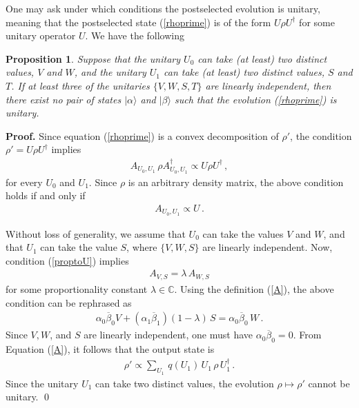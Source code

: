 \documentclass[aps,prl,twocolumn,superscriptaddress,groupedaddress]{revtex4}
\newtheorem{proposition}[theorem]{Proposition}
\def\>{\rangle}
\begin{document}
One may ask under which conditions the postselected evolution is unitary, meaning that the  postselected state  (\ref{rhoprime}) is of the form $U  \rho U^\dag$ for some unitary operator $U$.   
We have the following 
\begin{proposition}\label{prop:nonoiseless}
Suppose that the unitary $U_0 $ can take (at least) two distinct values, $V$ and $W$, and the unitary $U_1$ can take (at least) two distinct values, $S$ and $T$.  If at least three of the unitaries $\{ V, W, S, T\}$ are linearly independent, then there exist no pair of states $|\alpha\>$ and $|\beta\>$ such that the evolution (\ref{rhoprime}) is unitary. 
\end{proposition}  

{\bf Proof. }     Since equation (\ref{rhoprime}) is a convex decomposition of  $\rho'$,  the condition $\rho'  =  U\rho  U^\dag $ implies 
\begin{align}
 A_{U_0, U_1}\,  \rho  A_{U_0, U_1}^\dag    \propto  U \rho U^\dag \, ,
\end{align}  
for every $U_0$ and $U_1$.   Since $\rho$ is an arbitrary density matrix, the above condition holds if and only if 
\begin{align}\label{proptoU}  A_{U_0, U_1}\propto U\, .
\end{align} 

Without loss of generality, we assume that   $U_0$ can take the values $V$ and $W$, and that $U_1$ can take the value $S$, where  $\{V,W,S\}$  are linearly independent. Now, condition (\ref{proptoU}) implies 
\begin{align}
A_{  V,  S }  =  \lambda \,   A_{W,  S} 
\end{align} 
 for some proportionality constant $\lambda \in  \mathbb C$.  Using the definition (\ref{A}), the above condition can be rephrased as 
 \begin{align}
 \alpha_0 \overline \beta_0  V      +    ( \alpha_1 \overline \beta_1 )  (1-\lambda)   \,  S   =     \alpha_0 \overline \beta_0    \,   W  \, .
 \end{align}
 Since $V,W$, and $S$ are linearly independent, one must have  $ \alpha_0 \overline \beta_0   = 0$.  From Equation (\ref{A}), it follows that the output state is 
 \begin{align}
 \rho' \propto  \sum_{U_1}\,  q(U_1) \,     U_1  \, \rho \, U_1^\dag  \, .
 \end{align}
 Since the unitary $U_1$ can take two distinct values, the evolution $\rho \mapsto \rho'$ cannot be unitary. \qed 
\end{document}
